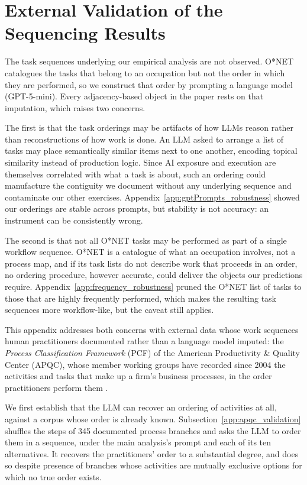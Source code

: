 \section{External Validation of the Sequencing Results}
\label{app:external_validation}

The task sequences underlying our empirical analysis are not observed.
O*NET catalogues the tasks that belong to an occupation but not the order in which they are performed, so we
construct that order by prompting a language model (GPT-5-mini).
Every adjacency-based object in the paper rests on that imputation, which raises two concerns.

The first is that the task orderings may be artifacts of how LLMs reason rather than reconstructions of
how work is done.
An LLM asked to arrange a list of tasks may place semantically similar items next to one another, encoding
topical similarity instead of production logic.
Since AI exposure and execution are themselves correlated with what a task is about, such an ordering could manufacture the
contiguity we document without any underlying sequence and contaminate our other exercises.
Appendix~\ref{app:gptPrompts_robustness} showed our orderings are stable across prompts, but stability is
not accuracy: an instrument can be consistently wrong.

The second is that not all O*NET tasks may be performed as part of a single workflow sequence.
O*NET is a catalogue of what an occupation involves, not a process map, and if its task lists do not describe
work that proceeds in an order, no ordering procedure, however accurate, could deliver the objects our predictions require.
Appendix~\ref{app:frequency_robustness} pruned the O*NET list of tasks to those that are highly frequently performed, which makes
the resulting task sequences more workflow-like, but the caveat still applies.

This appendix addresses both concerns with external data whose work sequences human practitioners
documented rather than a language model imputed: the \emph{Process Classification Framework} (PCF) of the
American Productivity \& Quality Center (APQC), whose member working groups have recorded since 2004 the
activities and tasks that make up a firm's business processes, in the order practitioners perform them
\citep{apqc_pcf}.

We first establish that the LLM can recover an ordering of activities at all, against a corpus whose order is
already known.
Subsection~\ref{app:apqc_validation} shuffles the steps of 345 documented process branches and asks the LLM to
order them in a sequence, under the main analysis's prompt and each of its ten alternatives.
It recovers the practitioners' order to a substantial degree, and does so despite presence of branches whose activities 
are mutually exclusive options for which no true order exists.

